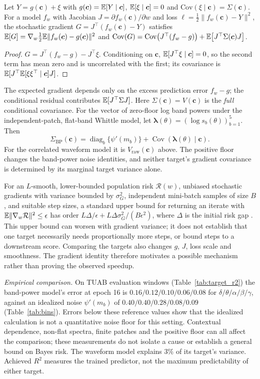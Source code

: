 \begin{proposition}\label{prop:grad}
Let $Y=g(\bm{c})+\xi$ with $g(\bm{c})=\mathbb{E}[Y\mid\bm{c}]$, $\mathbb{E}[\xi\mid\bm{c}]=0$ and
$\mathrm{Cov}(\xi\mid\bm{c})=\Sigma(\bm{c})$. For a model $f_w$ with Jacobian
$J=\partial f_w(\bm{c})/\partial w$ and loss $\ell=\tfrac12\|f_w(\bm{c})-Y\|^2$, the stochastic
gradient $G=J^\top(f_w(\bm{c})-Y)$ satisfies
$\mathbb{E}[G]=\nabla_w\tfrac12\mathbb{E}\|f_w(\bm{c})-g(\bm{c})\|^2$ and
$\mathrm{Cov}(G)=\mathrm{Cov}\bigl(J^\top(f_w-g)\bigr)+\mathbb{E}\bigl[J^\top\Sigma(\bm{c})J\bigr]$.
\end{proposition}
\begin{proof}
$G=J^\top(f_w-g)-J^\top\xi$. Conditioning on $\bm{c}$, $\mathbb{E}[J^\top\xi\mid\bm{c}]=0$, so the
second term has mean zero and is uncorrelated with the first; its covariance is
$\mathbb{E}[J^\top\mathbb{E}[\xi\xi^\top\mid\bm{c}]J]$.
\end{proof}
\noindent The expected gradient depends only on the excess prediction error $f_w-g$; the
conditional residual contributes $\mathbb{E}[J^\top\Sigma J]$. Here $\Sigma(\bm{c})=V(\bm{c})$ is
the \emph{full} conditional covariance. For the vector of zero-floor log band powers under
the independent-patch, flat-band Whittle model, let
$\bm{\lambda}(\theta)=(\log s_b(\theta))_{b=1}^5$. Then
\[
\Sigma_{\mathrm{BP}}(\bm{c})=\operatorname{diag}_{b}\{\psi'(m_b)\}
+\operatorname{Cov}(\bm{\lambda}(\theta)\mid\bm{c}).
\]
For the correlated waveform model it is $V_{\mathrm{raw}}(\bm{c})$ above. The positive floor
changes the band-power noise identities, and neither target's gradient covariance is determined
by its marginal target variance alone.

For an $L$-smooth, lower-bounded population risk $\mathcal{R}(w)$, unbiased stochastic gradients
with variance bounded by $\sigma_G^2$, independent mini-batch samples of size $B$, and suitable
step sizes, a standard upper bound for returning an iterate with
$\mathbb{E}\|\nabla_w\mathcal{R}\|^2\le\epsilon$ has order
$L\Delta/\epsilon+L\Delta\sigma_G^2/(B\epsilon^2)$, where $\Delta$ is the initial risk gap
\cite{ghadimi2013}. This upper bound can worsen with gradient variance; it does not establish
that one target necessarily needs proportionally more steps, or bound steps to a downstream
score. Comparing the targets also changes $g$, $J$, loss scale and smoothness. The gradient
identity therefore motivates a possible mechanism rather than proving the observed speedup.

\noindent\emph{Empirical comparison.} On TUAB evaluation windows (Table~\ref{tab:target_r2}) the
band-power model's error at epoch 16 is $0.16/0.12/0.10/0.06/0.08$ for
$\delta/\theta/\alpha/\beta/\gamma$, against an idealized noise $\psi'(m_b)$ of
$0.40/0.40/0.28/0.08/0.09$ (Table~\ref{tab:bins}). Errors below these reference values show
that the idealized calculation is not a quantitative noise floor for this setting. Contextual
dependence, non-flat spectra, finite patches and the positive floor can all affect the
comparison; these measurements do not isolate a cause or establish a general bound on Bayes
risk. The waveform model explains $3\%$ of its target's variance. Achieved $R^2$ measures the
trained predictor, not the maximum predictability of either target.

